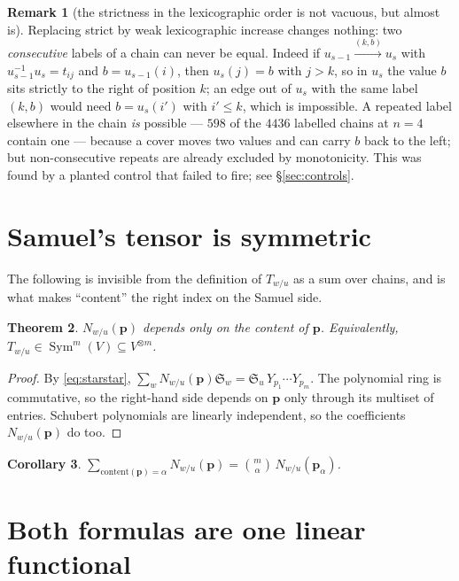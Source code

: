 \documentclass[11pt]{article}
\theoremstyle{plain}
\newtheorem{theorem}{Theorem}[section]
\newtheorem{corollary}[theorem]{Corollary}
\theoremstyle{definition}
\newtheorem{remark}[theorem]{Remark}
\DeclareMathOperator{\Sym}{Sym}
\newcommand{\Sch}{\mathfrak{S}}
\newcommand{\pv}{\mathbf{p}}
\begin{document}
\begin{remark}[the strictness in the lexicographic order is not vacuous, but
almost is]\label{rem:strict}
Replacing strict by weak lexicographic increase changes nothing: two
\emph{consecutive} labels of a chain can never be equal. Indeed if
$u_{s-1}\xrightarrow{(k,b)}u_s$ with $u_{s-1}^{-1}u_s=t_{ij}$ and $b=u_{s-1}(i)$,
then $u_s(j)=b$ with $j>k$, so in $u_s$ the value $b$ sits strictly to the right
of position $k$; an edge out of $u_s$ with the same label $(k,b)$ would need
$b=u_s(i')$ with $i'\le k$, which is impossible. A repeated label elsewhere in
the chain \emph{is} possible --- $598$ of the $4436$ labelled chains at $n=4$
contain one --- because a cover moves two values and can carry $b$ back to the
left; but non-consecutive repeats are already excluded by monotonicity. This
was found by a planted control that failed to fire; see \S\ref{sec:controls}.
\end{remark}

\section{Samuel's tensor is symmetric}

The following is invisible from the definition of $T_{w/u}$ as a sum over
chains, and is what makes ``content'' the right index on the Samuel side.

\begin{theorem}\label{thm:sym}
$N_{w/u}(\pv)$ depends only on the content of $\pv$. Equivalently,
$T_{w/u}\in\Sym^m(V)\subseteq V^{\otimes m}$.
\end{theorem}

\begin{proof}
By \eqref{eq:starstar}, $\sum_w N_{w/u}(\pv)\Sch_w=\Sch_u\,Y_{p_1}\cdots Y_{p_m}$.
The polynomial ring is commutative, so the right-hand side depends on $\pv$ only
through its multiset of entries. Schubert polynomials are linearly independent,
so the coefficients $N_{w/u}(\pv)$ do too.
\end{proof}

\begin{corollary}\label{cor:multinom}
$\displaystyle\sum_{\mathrm{content}(\pv)=\alpha}N_{w/u}(\pv)=\binom{m}{\alpha}\,N_{w/u}(\pv_\alpha)$.
\end{corollary}

\section{Both formulas are one linear functional}
\end{document}
